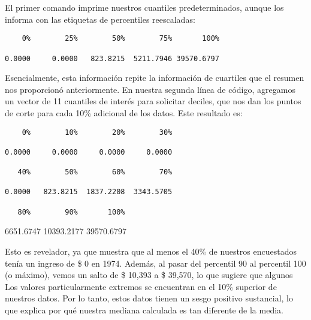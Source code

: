 \documentclass[
]{book}
\newenvironment{Shaded}{\begin{snugshade}}{\end{snugshade}}
\newcommand{\DecValTok}[1]{\textcolor[rgb]{0.00,0.00,0.81}{#1}}
\newcommand{\FunctionTok}[1]{\textcolor[rgb]{0.00,0.00,0.00}{#1}}
\newcommand{\NormalTok}[1]{#1}
\newcommand{\SpecialCharTok}[1]{\textcolor[rgb]{0.00,0.00,0.00}{#1}}
\begin{document}
\begin{Shaded}
\end{Shaded}

El primer comando imprime nuestros cuantiles predeterminados, aunque los informa con las etiquetas de percentiles reescaladas:

\begin{verbatim}
    0%        25%        50%        75%       100%

0.0000     0.0000   823.8215  5211.7946 39570.6797
\end{verbatim}

Esencialmente, esta información repite la información de cuartiles que el resumen nos proporcionó anteriormente. En nuestra segunda línea de código, agregamos un vector de 11 cuantiles de interés para solicitar deciles, que nos dan los puntos de corte para cada 10\% adicional de los datos. Este resultado es:

\begin{verbatim}
    0%        10%        20%        30%

0.0000     0.0000     0.0000     0.0000

   40%        50%        60%        70%

0.0000   823.8215  1837.2208  3343.5705

   80%        90%       100%
\end{verbatim}

6651.6747 10393.2177 39570.6797

Esto es revelador, ya que muestra que al menos el 40\% de nuestros encuestados tenía un ingreso de \$ 0 en 1974. Además, al pasar del percentil 90 al percentil 100 (o máximo), vemos un salto de \$ 10,393 a \$ 39,570, lo que sugiere que algunos Los valores particularmente extremos se encuentran en el 10\% superior de nuestros datos. Por lo tanto, estos datos tienen un sesgo positivo sustancial, lo que explica por qué nuestra mediana calculada es tan diferente de la media.
\end{document}
